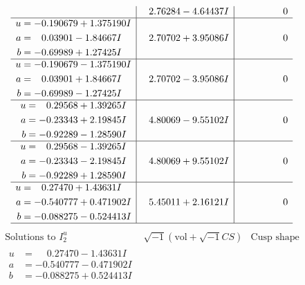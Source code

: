 \documentclass[1p]{elsarticle_modified}
\theoremstyle{definition}
\newcommand{\I}{\sqrt{-1}}
\begin{document}
$$\begin{array}{c|c|c}
 & \phantom{-}2.76284 - 4.64437 I & \phantom{-0.000000 } 0 \\ \hline\begin{aligned}
u &= -0.190679 + 1.375190 I \\
a &= \phantom{-}0.03901 - 1.84667 I \\
b &= -0.69989 + 1.27425 I\end{aligned}
 & \phantom{-}2.70702 + 3.95086 I & \phantom{-0.000000 } 0 \\ \hline\begin{aligned}
u &= -0.190679 - 1.375190 I \\
a &= \phantom{-}0.03901 + 1.84667 I \\
b &= -0.69989 - 1.27425 I\end{aligned}
 & \phantom{-}2.70702 - 3.95086 I & \phantom{-0.000000 } 0 \\ \hline\begin{aligned}
u &= \phantom{-}0.29568 + 1.39265 I \\
a &= -0.23343 + 2.19845 I \\
b &= -0.92289 - 1.28590 I\end{aligned}
 & \phantom{-}4.80069 - 9.55102 I & \phantom{-0.000000 } 0 \\ \hline\begin{aligned}
u &= \phantom{-}0.29568 - 1.39265 I \\
a &= -0.23343 - 2.19845 I \\
b &= -0.92289 + 1.28590 I\end{aligned}
 & \phantom{-}4.80069 + 9.55102 I & \phantom{-0.000000 } 0 \\ \hline\begin{aligned}
u &= \phantom{-}0.27470 + 1.43631 I \\
a &= -0.540777 + 0.471902 I \\
b &= -0.088275 - 0.524413 I\end{aligned}
 & \phantom{-}5.45011 + 2.16121 I & \phantom{-0.000000 } 0\\
 \hline 
 \end{array}$$\newpage$$\begin{array}{c|c|c}  
\text{Solutions to }I^u_{2}& \I (\text{vol} + \sqrt{-1}CS) & \text{Cusp shape}\\
 \hline 
\begin{aligned}
u &= \phantom{-}0.27470 - 1.43631 I \\
a &= -0.540777 - 0.471902 I \\
b &= -0.088275 + 0.524413 I\end{aligned}

\end{array}$$
\end{document}
